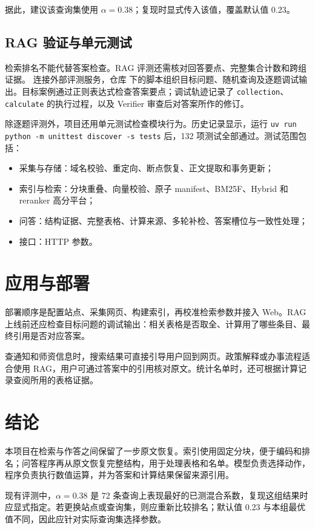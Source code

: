 \documentclass[UTF8,zihao=-4,fontset=fandol]{ctexart}
\newcommand{\code}[1]{\texttt{#1}}
\begin{document}
据此，建议该查询集使用 $\alpha=0.38$；复现时显式传入该值，覆盖默认值 0.23。

\subsection{RAG 验证与单元测试}

检索排名不能代替答案检查。RAG 评测还需核对回答要点、完整集合计数和跨组证据。 连接外部评测服务，仓库  下的脚本组织目标问题、随机查询及逐题调试输出。目标案例通过正则表达式检查答案要点；调试轨迹记录了 \code{collection}、\code{calculate} 的执行过程，以及 Verifier 审查后对答案所作的修订。

除逐题评测外，项目还用单元测试检查模块行为。历史记录显示，运行 \code{uv run python -m unittest discover -s tests} 后，132 项测试全部通过。测试范围包括：
\begin{itemize}
  \item 采集与存储：域名校验、重定向、断点恢复、正文提取和事务更新；
  \item 索引与检索：分块重叠、向量校验、原子 manifest、BM25F、Hybrid 和 reranker 高分平台；
  \item 问答：结构证据、完整表格、计算来源、多轮补检、答案槽位与一致性处理；
  \item 接口：HTTP 参数。
\end{itemize}

\section{应用与部署}

部署顺序是配置站点、采集网页、构建索引，再校准检索参数并接入 Web。RAG 上线前还应检查目标问题的调试输出：相关表格是否取全、计算用了哪些条目、最终引用是否对应答案。

查通知和师资信息时，搜索结果可直接引导用户回到网页。政策解释或办事流程适合使用 RAG，用户可通过答案中的引用核对原文。统计名单时，还可根据计算记录查阅所用的表格证据。

\section{结论}

本项目在检索与作答之间保留了一步原文恢复。索引使用固定分块，便于编码和排名；问答程序再从原文恢复完整结构，用于处理表格和名单。模型负责选择动作，程序负责执行数值运算，并为答案和计算结果保留来源引用。

现有评测中，$\alpha=0.38$ 是 72 条查询上表现最好的已测混合系数，复现这组结果时应显式指定。若更换站点或查询集，则应重新比较排名；默认值 0.23 与本组最优值不同，因此应针对实际查询集选择参数。
\end{document}

